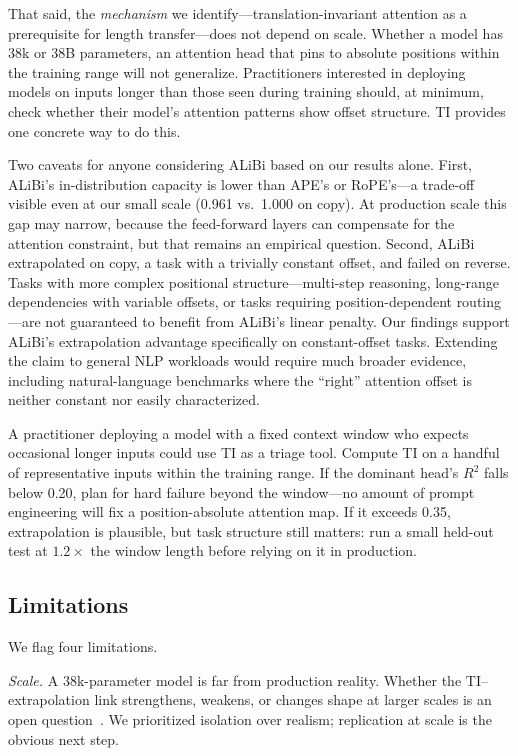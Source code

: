 \documentclass[10pt,twocolumn]{article}
\begin{document}
That said, the \emph{mechanism} we identify---translation-invariant attention as a prerequisite for length transfer---does not depend on scale.
Whether a model has 38k or 38B parameters, an attention head that pins to absolute positions within the training range will not generalize.
Practitioners interested in deploying models on inputs longer than those seen during training should, at minimum, check whether their model's attention patterns show offset structure.
TI provides one concrete way to do this.

Two caveats for anyone considering ALiBi based on our results alone.
First, ALiBi's in-distribution capacity is lower than APE's or RoPE's---a trade-off visible even at our small scale (0.961 vs.\ 1.000 on copy).
At production scale this gap may narrow, because the feed-forward layers can compensate for the attention constraint, but that remains an empirical question.
Second, ALiBi extrapolated on copy, a task with a trivially constant offset, and failed on reverse.
Tasks with more complex positional structure---multi-step reasoning, long-range dependencies with variable offsets, or tasks requiring position-dependent routing---are not guaranteed to benefit from ALiBi's linear penalty.
Our findings support ALiBi's extrapolation advantage specifically on constant-offset tasks.
Extending the claim to general NLP workloads would require much broader evidence, including natural-language benchmarks where the ``right'' attention offset is neither constant nor easily characterized.

A practitioner deploying a model with a fixed context window who expects occasional longer inputs could use TI as a triage tool.
Compute TI on a handful of representative inputs within the training range.
If the dominant head's $R^2$ falls below 0.20, plan for hard failure beyond the window---no amount of prompt engineering will fix a position-absolute attention map.
If it exceeds 0.35, extrapolation is plausible, but task structure still matters: run a small held-out test at $1.2\times$ the window length before relying on it in production.

\subsection{Limitations}
\label{sec:limitations}

We flag four limitations.

\emph{Scale.}
A 38k-parameter model is far from production reality.
Whether the TI--extrapolation link strengthens, weakens, or changes shape at larger scales is an open question~\cite{liu2024scaling}.
We prioritized isolation over realism; replication at scale is the obvious next step.
\end{document}
